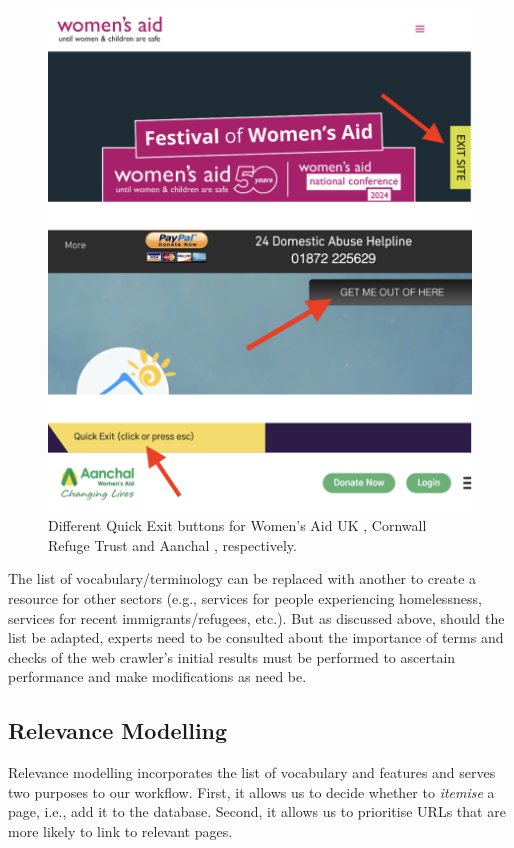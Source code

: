 \documentclass[conference]{IEEEtran}
\begin{document}
\begin{figure}
    \centering
    \includegraphics[width=1\linewidth]{quick-exit.png}
    \caption{Different Quick Exit buttons for Women's Aid UK \cite{wauk}, Cornwall Refuge Trust\cite{cornrt} and  Aanchal \cite{aanchalwa}, respectively.}
    \label{fig:exit}
\end{figure}

The list of vocabulary/terminology can be replaced with another to create a resource for other sectors (e.g., services for people experiencing homelessness, services for recent immigrants/refugees, etc.). 
But as discussed above, should the list be adapted, experts need to be consulted about the importance of terms and checks of the web crawler's initial results must be performed to ascertain performance and make modifications as need be. 

\subsection{Relevance Modelling}
\label{relmod}

Relevance modelling incorporates the list of vocabulary and features and serves two purposes to our workflow. First, it allows us to decide whether to \textit{itemise} a page, i.e., add it to the database. Second, it allows us to prioritise URLs that are more likely to link to relevant pages.
\end{document}

